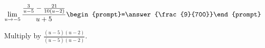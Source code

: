 \documentclass{ximera}
\author{Bart Snapp}
\begin{document}
\begin{exercise}

\[
\lim_{u\to -5 } \frac{\frac{3}{u-5}-\frac{21}{10 (u-2)}}{u+5}  \begin{prompt}=\answer{\frac{9}{700}}\end{prompt}
\]
\begin{hint}
Multiply by $\frac{(u-5) (u-2)}{(u-5) (u-2)}$.
\end{hint}
\end{exercise}
\end{document}
